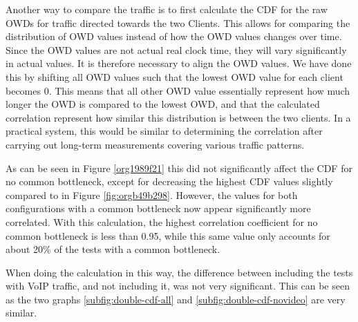 \documentclass[a4paper,11pt]{article}
\begin{document}
Another way to compare the traffic is to first calculate the CDF for the raw OWDs for traffic directed towards the two Clients. This allows for comparing the distribution of OWD values instead of how the OWD values changes over time. Since the OWD values are not actual real clock time, they will vary significantly in actual values. It is therefore necessary to align the OWD values. We have done this by shifting all OWD values such that the lowest OWD value for each client becomes 0. This means that all other OWD value essentially represent how much longer the OWD is compared to the lowest OWD, and that the calculated correlation represent how similar this distribution is between the two clients. In a practical system, this would be similar to determining the correlation after carrying out long-term measurements covering various traffic patterns.

As can be seen in Figure \ref{org1989f21} this did not significantly affect the CDF for no common bottleneck, except for decreasing the highest CDF values slightly compared to in Figure \ref{fig:orgb49b298}. However, the values for both configurations with a common bottleneck now appear significantly more correlated. With this calculation, the highest correlation coefficient for no common bottleneck is less than 0.95, while this same value only accounts for about 20\% of the tests with a common bottleneck.

When doing the calculation in this way, the difference between including the tests with VoIP traffic, and not including it, was not very significant. This can be seen as the two graphs \ref{subfig:double-cdf-all} and \ref{subfig:double-cdf-novideo} are very similar.
\end{document}
